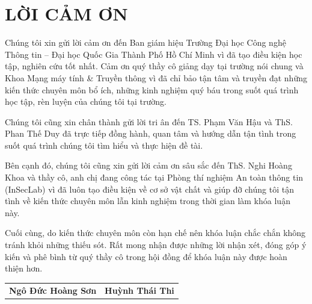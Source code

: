\chapter*{LỜI CẢM ƠN}

Chúng tôi xin gửi lời cảm ơn đến Ban giám hiệu Trường Đại học Công nghệ Thông tin – Đại học Quốc Gia Thành Phố Hồ Chí Minh vì đã tạo điều kiện học tập, nghiên cứu tốt nhất. Cảm ơn quý thầy cô giảng dạy tại trường nói chung và Khoa Mạng máy tính \& Truyền thông vì đã chỉ bảo tận tâm và truyền đạt những kiến thức chuyên môn bổ ích, những kinh nghiệm quý báu trong suốt quá trình học tập, rèn luyện của chúng tôi tại trường.

\bigbreak\noindent
Chúng tôi cũng xin chân thành gửi lời tri ân đến TS. Phạm Văn Hậu và ThS. Phan Thế Duy đã trực tiếp đồng hành, quan tâm và hướng dẫn tận tình trong suốt quá trình chúng tôi tìm hiểu và thực hiện đề tài.

\bigbreak\noindent
Bên cạnh đó, chúng tôi cũng xin gửi lời cảm ơn sâu sắc đến ThS. Nghi Hoàng Khoa và thầy cô, anh chị đang công tác tại Phòng thí nghiệm An toàn thông tin (InSecLab) vì đã luôn tạo điều kiện về cơ sở vật chất và giúp đỡ chúng tôi tận tình về kiến thức chuyên môn lẫn kinh nghiệm trong thời gian làm khóa luận này.

\bigbreak\noindent
Cuối cùng, do kiến thức chuyên môn còn hạn chế nên khóa luận chắc chắn không tránh khỏi những thiếu sót. Rất mong nhận được những lời nhận xét, đóng góp ý kiến và phê bình từ quý thầy cô trong hội đồng để khóa luận này được hoàn thiện hơn.

\vspace*{40pt}
\begin{center}
    \begingroup
    \setlength{\tabcolsep}{50pt}
    \begin{tabular}{cc}
        \textbf{Ngô Đức Hoàng Sơn} & \textbf{Huỳnh Thái Thi}
    \end{tabular}
    \endgroup
\end{center}